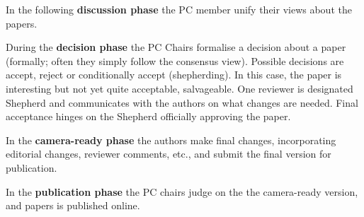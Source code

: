 \documentclass{ou-report}
\newcommand{\outline}[1]{{\color{blue} #1}}
\begin{document}
In the following \textbf{discussion phase} the PC member unify their views about 
the papers.

During the \textbf{decision phase} the PC Chairs formalise a decision about a 
paper (formally; often they simply follow the consensus view). Possible 
decisions are accept, reject or conditionally accept (shepherding). In this 
case, the paper is interesting but not yet quite acceptable, salvageable. One 
reviewer is designated Shepherd and communicates with the authors on what 
changes are needed. Final acceptance hinges on the Shepherd officially 
approving the paper.

In the \textbf{camera-ready phase} the authors make final changes, 
incorporating editorial changes, reviewer comments, etc., and submit the final 
version for publication.

In the \textbf{publication phase} the PC chairs judge on the the camera-ready 
version, and papers is published online.


    

            
\end{document}
